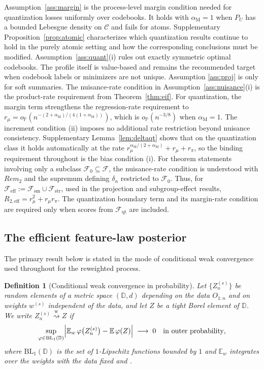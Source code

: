 \documentclass[11pt]{article}
\newtheorem{definition}{Definition}
\newcommand{\E}{\mathbb E}
\newcommand{\Pp}{\mathbb P}
\newcommand{\opro}{o_{\Pp}}
\newcommand{\dtow}{\overset{\mathrm w}{\rightsquigarrow}}
\newcommand{\calC}{\mathcal C}
\newcommand{\calF}{\mathcal F}
\newcommand{\BL}{\mathrm{BL}_1}
\newcommand{\am}{\alpha_{\mathrm M}}
\begin{document}
Assumption~\ref{ass:margin} is the process-level margin condition needed for quantization losses uniformly over codebooks.  It holds with $\am=1$ when $P_U$ has a bounded Lebesgue density on $\calC$ and fails for atoms. Supplementary Proposition~\ref{prop:atomic} characterizes which quantization results continue to hold in the purely atomic setting and how the corresponding conclusions must be modified. Assumption~\ref{ass:quant}\textup{(i)} rules out exactly symmetric optimal codebooks. The profile itself is value-based and remains the recommended target when codebook labels or minimizers are not unique.  
Assumption \ref{ass:proj} is only for soft summaries. The nuisance-rate condition in Assumption~\ref{ass:nuisance}\textup{(i)} is the product-rate requirement from Theorem~\ref{thm:eif}. For quantization, the margin term strengthens the regression-rate requirement to $r_\mu=\opro(n^{-(2+\am)/(4(1+\am))})$, which is $\opro(n^{-3/8})$ when $\am=1$.
The increment condition \textup{(ii)} imposes no additional rate restriction beyond nuisance consistency. Supplementary Lemma~\ref{lem:deltaqt} shows that on the quantization class it holds automatically at the rate $r_\mu^{\am/(2+\am)}+r_\mu+r_\pi$, so the binding requirement throughout is the bias condition \textup{(i)}.
For theorem statements involving only a subclass $\calF_0\subseteq\calF$, the nuisance-rate
condition is understood with $Rem_2$ and the supremum defining $\delta_n$ restricted
to $\calF_0$.  Thus, for
$\calF_{\mathrm{eff}}:=\calF_{\mathrm{sm}}\cup\calF_{\mathrm{str}}$, used in the
projection and subgroup-effect results, $R_{2,\mathrm{eff}}=r_\mu^2+r_\mu r_\pi$.
The quantization boundary term and its margin-rate condition are required only
when scores from $\calF_{\mathrm{qt}}$ are included.

\subsection{The efficient feature-law posterior}\label{sec:bvm}

The primary result below is stated in the mode of conditional weak convergence used throughout for the reweighted process.

\begin{definition}[Conditional weak convergence in probability]\label{def:condweak}
Let $\{Z_n^{(s)}\}$ be random elements of a metric space $(\mathbb D,d)$ depending on the data $O_{1:n}$ and on weights $w^{(s)}$ independent of the data, and let $Z$ be a tight Borel element of $\mathbb D$. We write $Z_n^{(s)}\dtow Z$ if
\begin{equation*}
\sup_{\varphi\in\BL(\mathbb D)}\Bigl|\E_w\,\varphi\bigl(Z_n^{(s)}\bigr)-\E\,\varphi(Z)\Bigr|\;\longrightarrow\;0
\quad\text{in outer probability},
\end{equation*}
where $\BL(\mathbb D)$ is the set of $1$-Lipschitz functions bounded by $1$ and $\E_w$ integrates over the weights with the data fixed \citep[Section~3.6]{vdvwellner1996} and \citep[Section~2.2.3]{kosorok2008}.
\end{definition}
\end{document}
